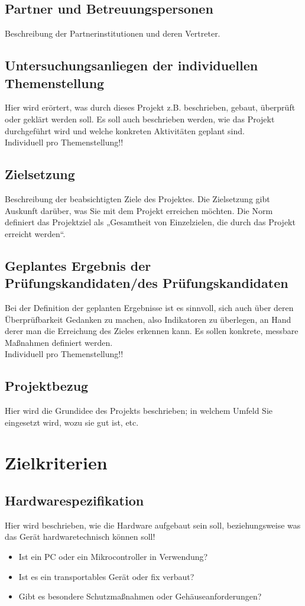 \documentclass[12pt]{article}
\begin{document}
\subsection{Partner und Betreuungspersonen}
Beschreibung der Partnerinstitutionen und deren Vertreter.

\subsection{Untersuchungsanliegen der individuellen Themenstellung}
Hier wird erörtert, was durch dieses Projekt z.B. beschrieben, gebaut, überprüft oder geklärt werden soll.
Es soll auch beschrieben werden, wie das Projekt durchgeführt wird und welche konkreten Aktivitäten geplant sind. \\
Individuell pro Themenstellung!!

\subsection{Zielsetzung}
Beschreibung der beabsichtigten Ziele des Projektes.
Die Zielsetzung gibt Auskunft darüber, was Sie mit dem Projekt erreichen möchten.
Die Norm definiert das Projektziel als „Gesamtheit von Einzelzielen, die durch das Projekt erreicht werden“.

\subsection{Geplantes Ergebnis der Prüfungskandidaten/des Prüfungskandidaten}
Bei der Definition der geplanten Ergebnisse ist es sinnvoll, sich auch über deren Überprüfbarkeit Gedanken zu machen, also Indikatoren zu überlegen, an Hand derer man die Erreichung des Zieles erkennen kann.
Es sollen konkrete, messbare Maßnahmen definiert werden. \\
Individuell pro Themenstellung!!

\subsection{Projektbezug}
Hier wird die Grundidee des Projekts beschrieben;
in welchem Umfeld Sie eingesetzt wird, wozu sie gut ist, etc.

\section{Zielkriterien}
\subsection{Hardwarespezifikation}
Hier wird beschrieben, wie die Hardware aufgebaut sein soll, beziehungsweise was das Gerät hardwaretechnisch können soll!
\begin{itemize}
    \item Ist ein PC oder ein Mikrocontroller in Verwendung?
    \item Ist es ein transportables Gerät oder fix verbaut?
    \item Gibt es besondere Schutzmaßnahmen oder Gehäuseanforderungen?
\end{itemize}
\end{document}
